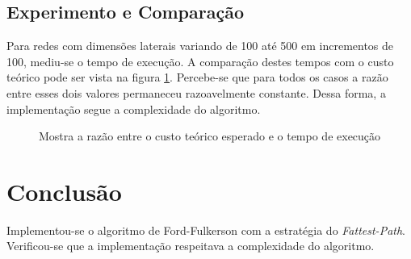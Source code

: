 \documentclass{iiufrgs}
\begin{document}
\subsection{Experimento e Comparação}
Para redes com dimensões laterais variando de 100 até 500 em incrementos de 100, mediu-se o tempo de execução. A comparação destes tempos
com o custo teórico pode ser vista na figura \ref{fig:comparison}. Percebe-se que para todos os casos a razão entre esses dois valores permaneceu
razoavelmente constante. Dessa forma, a implementação segue a complexidade do algoritmo.

\begin{figure}[H]
\centering
{}
\caption{Mostra a raz\~ao entre o custo teórico esperado e o tempo de execuç\~ao}
\label{fig:comparison}
\end{figure}


\section{Conclus\~ao}
Implementou-se o algoritmo de Ford-Fulkerson com a estratégia do \emph{Fattest-Path}. Verificou-se que a implementação respeitava a
complexidade do algoritmo.
\end{document}
